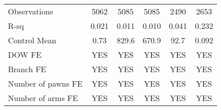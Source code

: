 \begin{tabular}{lcccc|c}
      &       &       &       &       &  \\
\midrule
Observations & 5062  & 5085  & 5085  & 2490  & 2653 \\
R-sq  & 0.021 & 0.011 & 0.010 & 0.041 & 0.232 \\
Control Mean & 0.73  & 829.6 & 670.9 & 92.7  & 0.092 \\
\midrule
DOW FE & YES   & YES   & YES   & YES   & YES \\
Branch FE & YES   & YES   & YES   & YES   & YES \\
Number of pawns FE & YES   & YES   & YES   & YES   & YES \\
Number of arms FE & YES   & YES   & YES   & YES   & YES \\
\bottomrule
\bottomrule
\end{tabular}%

